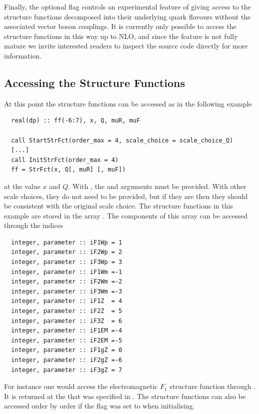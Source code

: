 Finally, the optional flag  controls an
experimental feature of giving access to the structure functions
decomposed into their underlying quark flavours without the associated
vector boson couplings. It is currently only possible to access the
structure functions in this way up to NLO, and since the feature is
not fully mature we invite interested readers to inspect the source
code directly for more information.

\subsection{Accessing the Structure Functions}
\label{sec:structure-funcs-access}
At this point the structure functions can be accessed as in the following example
\begin{lstlisting}
  real(dp) :: ff(-6:7), x, Q, muR, muF
  
  call StartStrFct(order_max = 4, scale_choice = scale_choice_Q)
  [...]
  call InitStrFct(order_max = 4)
  ff = StrFct(x, Q[, muR] [, muF])
\end{lstlisting}
at the value $x$ and $Q$.
%
With , the  and 
arguments must be provided.
%
With other scale choices, they do not need to be provided, but if they
are then they should be consistent with the original scale choice.
%
The structure functions in this example are stored in the
array . The components of this array can be accessed through
the indices
\begin{lstlisting}
  integer, parameter :: iF1Wp = 1   
  integer, parameter :: iF2Wp = 2   
  integer, parameter :: iF3Wp = 3   
  integer, parameter :: iF1Wm =-1   
  integer, parameter :: iF2Wm =-2   
  integer, parameter :: iF3Wm =-3   
  integer, parameter :: iF1Z  = 4   
  integer, parameter :: iF2Z  = 5   
  integer, parameter :: iF3Z  = 6   
  integer, parameter :: iF1EM =-4   
  integer, parameter :: iF2EM =-5   
  integer, parameter :: iF1gZ = 0  
  integer, parameter :: iF2gZ =-6 
  integer, parameter :: iF3gZ = 7  
\end{lstlisting}
For instance one would access the electromagnetic $F_1$ structure
function through . It is returned at the 
that was specified in .
%
The structure functions can also be accessed order by order if the
 flag was set to  when initialising.
